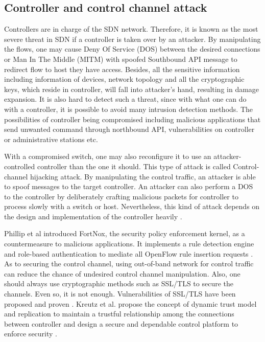 \subsection{Controller and control channel attack}
Controllers are in charge of the SDN network. Therefore, it is known as the most severe threat in SDN if a controller is taken over by an attacker. By manipulating the flows, one may cause Deny Of Service (DOS) between the desired connections or Man In The Middle (MITM) with spoofed Southbound API message to redirect flow to host they have access. Besides, all the sensitive information including information of devices, network topology and all the cryptographic keys, which reside in controller, will fall into attacker's hand, resulting in damage expansion. It is also hard to detect such a threat, since with what one can do with a controller, it is possible to avoid many intrusion detection methods. The possibilities of controller being compromised including malicious applications that send unwanted command through northbound API, vulnerabilities on controller or administrative stations etc.

With a compromised switch, one may also reconfigure it to use an attacker-controlled controller than the one it should. This type of attack is called Control-channel hijacking attack. By manipulating the control traffic, an attacker is able to spoof messages to the target controller. An attacker can also perform a DOS to the controller by deliberately crafting malicious packets for controller to process slowly with a switch or host. Nevertheless, this kind of attack depends on the design and implementation of the controller heavily \cite{AAS14}.

Phillip et al introduced FortNox, the security policy enforcement kernel, as a countermeasure to malicious applications. It implements a rule detection engine and role-based authentication to mediate all OpenFlow rule insertion requests \cite{PSYFTG12}. As to securing the control channel, using out-of-band network for control traffic can reduce the chance of undesired control channel manipulation. Also, one should always use cryptographic methods such as SSL/TLS to secure the channels. Even so, it is not enough. Vulnerabilities of SSL/TLS have been proposed and proven \cite{HRKC12}. Kreutz et al. propose the concept of dynamic trust model and replication to maintain a trustful relationship among the connections between controller and design a secure and dependable control platform to enforce security \cite{KDFRV13}. 

